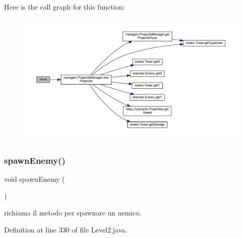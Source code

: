 Here is the call graph for this function\+:\nopagebreak
\begin{figure}[H]
\begin{center}
\leavevmode
\includegraphics[width=350pt]{classscenes_1_1_level2_a200b073564fc341f34b6112718742bae_cgraph}
\end{center}
\end{figure}
\mbox{\label{classscenes_1_1_level2_addfc0c3129b6ff606f7276e175f31a15}} 
\subsubsection{\texorpdfstring{spawn\+Enemy()}{spawnEnemy()}}
{\footnotesize\ttfamily void spawn\+Enemy (\begin{DoxyParamCaption}{ }\end{DoxyParamCaption})\hspace{0.3cm}{\ttfamily [private]}}



richiama il metodo per spawnare un nemico. 



Definition at line 330 of file Level2.\+java.

